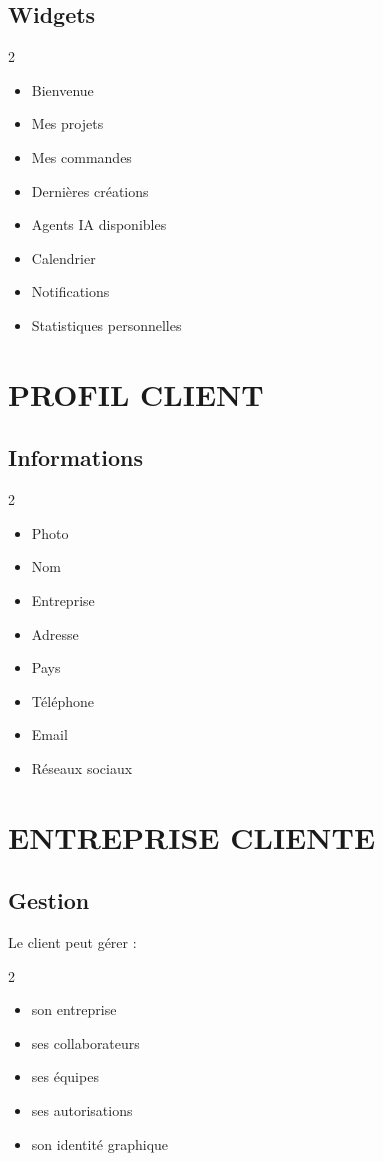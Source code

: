 \documentclass[12pt,a4paper,oneside]{book}
\begin{document}
\section{Widgets}
\begin{multicols}{2}
\begin{itemize}
\item Bienvenue
\item Mes projets
\item Mes commandes
\item Dernières créations
\item Agents IA disponibles
\item Calendrier
\item Notifications
\item Statistiques personnelles
\end{itemize}
\end{multicols}

\chapter{PROFIL CLIENT}

\section{Informations}
\begin{multicols}{2}
\begin{itemize}
\item Photo
\item Nom
\item Entreprise
\item Adresse
\item Pays
\item Téléphone
\item Email
\item Réseaux sociaux
\end{itemize}
\end{multicols}

\chapter{ENTREPRISE CLIENTE}

\section{Gestion}
Le client peut gérer :
\begin{multicols}{2}
\begin{itemize}
\item son entreprise
\item ses collaborateurs
\item ses équipes
\item ses autorisations
\item son identité graphique
\end{itemize}
\end{multicols}
\end{document}

